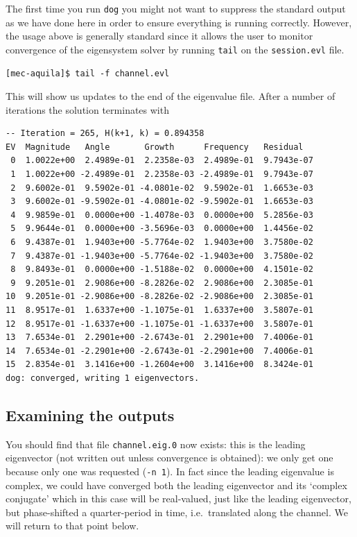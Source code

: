 \documentclass[11pt,a4paper]{report}
\newcommand{\ie}{i.e.\ }
\begin{document}
The first time you run \verb+dog+ you might not want to suppress the
standard output as we have done here in order to ensure everything is
running correctly. However, the usage above is generally standard
since it allows the user to monitor convergence of the eigensystem
solver by running \verb+tail+ on the \verb+session.evl+ file.  {\small
\begin{verbatim}
[mec-aquila]$ tail -f channel.evl
\end{verbatim}
} This will show us updates to the end of the eigenvalue file.  After
a number of iterations the solution terminates with {\small
\begin{verbatim}
-- Iteration = 265, H(k+1, k) = 0.894358
EV  Magnitude   Angle       Growth      Frequency   Residual
 0  1.0022e+00  2.4989e-01  2.2358e-03  2.4989e-01  9.7943e-07
 1  1.0022e+00 -2.4989e-01  2.2358e-03 -2.4989e-01  9.7943e-07
 2  9.6002e-01  9.5902e-01 -4.0801e-02  9.5902e-01  1.6653e-03
 3  9.6002e-01 -9.5902e-01 -4.0801e-02 -9.5902e-01  1.6653e-03
 4  9.9859e-01  0.0000e+00 -1.4078e-03  0.0000e+00  5.2856e-03
 5  9.9644e-01  0.0000e+00 -3.5696e-03  0.0000e+00  1.4456e-02
 6  9.4387e-01  1.9403e+00 -5.7764e-02  1.9403e+00  3.7580e-02
 7  9.4387e-01 -1.9403e+00 -5.7764e-02 -1.9403e+00  3.7580e-02
 8  9.8493e-01  0.0000e+00 -1.5188e-02  0.0000e+00  4.1501e-02
 9  9.2051e-01  2.9086e+00 -8.2826e-02  2.9086e+00  2.3085e-01
10  9.2051e-01 -2.9086e+00 -8.2826e-02 -2.9086e+00  2.3085e-01
11  8.9517e-01  1.6337e+00 -1.1075e-01  1.6337e+00  3.5807e-01
12  8.9517e-01 -1.6337e+00 -1.1075e-01 -1.6337e+00  3.5807e-01
13  7.6534e-01  2.2901e+00 -2.6743e-01  2.2901e+00  7.4006e-01
14  7.6534e-01 -2.2901e+00 -2.6743e-01 -2.2901e+00  7.4006e-01
15  2.8354e-01  3.1416e+00 -1.2604e+00  3.1416e+00  8.3424e-01
dog: converged, writing 1 eigenvectors.
\end{verbatim}
} 

\subsection{Examining the outputs}

You should find that file \verb+channel.eig.0+ now exists: this is the
leading eigenvector (not written out unless convergence is obtained):
we only get one because only one was requested (\verb+-n 1+).  In fact
since the leading eigenvalue is complex, we could have converged both
the leading eigenvector and its `complex conjugate' which in this case
will be real-valued, just like the leading eigenvector, but
phase-shifted a quarter-period in time, \ie translated along the
channel. We will return to that point below.
\end{document}
